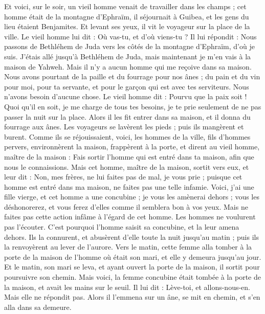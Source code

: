 \begin{multicols}{2}
Et voici, sur le soir, un vieil homme venait de travailler dans les champs ; cet homme était de la montagne d'Ephraïm, il séjournait à Guibea, et les gens du lieu étaient Benjamites.
Et levant ses yeux, il vit le voyageur sur la place de la ville. Le vieil homme lui dit : Où vas-tu, et d'où viens-tu ?
Il lui répondit : Nous passons de Bethléhem de Juda vers les côtés de la montagne d'Ephraïm, d'où je suis. J'étais allé jusqu'à Bethléhem de Juda, mais maintenant je m'en vais à la maison de Yahweh. Mais il n'y a aucun homme qui me reçoive dans sa maison.
Nous avons pourtant de la paille et du fourrage pour nos ânes ; du pain et du vin pour moi,  pour ta servante, et pour le garçon qui est avec tes serviteurs. Nous n'avons besoin d'aucune chose.
Le vieil homme dit : Pourvu que la paix soit ! Quoi qu'il en soit, je me charge de tous tes besoins, je te prie seulement de ne pas passer la nuit sur la place.
Alors il les fit entrer dans sa maison, et il donna du fourrage aux ânes. Les voyageurs se lavèrent les pieds ; puis ils mangèrent et burent.
Comme ils se réjouissaient, voici, les hommes de la ville, fils d'hommes pervers, environnèrent la maison, frappèrent à la porte, et dirent au vieil homme, maître de la maison : Fais sortir l'homme qui est entré dans ta maison, afin que nous le connaissions.
Mais cet homme, maître de la maison, sortit vers eux, et leur dit : Non, mes frères, ne lui faites pas de mal, je vous prie ; puisque cet homme est entré dans ma maison, ne faites pas une telle infamie.
Voici, j'ai une fille vierge, et cet homme a une concubine ; je vous les amènerai dehors ; vous les déshonorerez, et vous ferez d'elles comme il semblera bon à vos yeux. Mais ne faites pas cette action infâme à l'égard de cet homme.
Les hommes ne voulurent pas l'écouter. C'est pourquoi l'homme saisit sa concubine, et la leur amena dehors. Ils la connurent, et abusèrent d'elle toute la nuit jusqu'au matin ; puis ils la renvoyèrent au lever de l'aurore.
Vers le matin, cette femme alla tomber à la porte de la maison de l'homme où était son mari, et elle y demeura jusqu'au jour.
Et le matin, son mari se leva, et ayant ouvert la porte de la maison, il sortit pour poursuivre son chemin. Mais voici, la femme concubine était tombée à la porte de la maison, et avait les mains sur le seuil.
Il lui dit : Lève-toi, et allons-nous-en. Mais elle ne répondit pas. Alors il l'emmena sur un âne, se mit en chemin, et s'en alla dans sa demeure.

\end{multicols}
